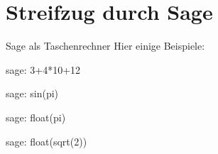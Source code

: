 \documentclass[hyperref={xetex}]{beamer}
\begin{document}



\section{Streifzug durch Sage}


\begin{frame}[fragile]{Sage als Taschenrechner}
Hier einige Beispiele: 
\begin{sagecommandline}
sage: 3+4*10+12 
\end{sagecommandline}
\begin{sagecommandline}
sage: sin(pi) 
\end{sagecommandline}
\begin{sagecommandline}
sage: float(pi)
\end{sagecommandline}
\begin{sagecommandline}
sage: float(sqrt(2))
\end{sagecommandline}
\end{frame}
\end{document}
